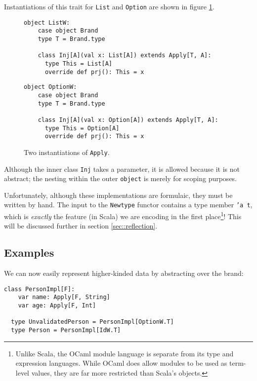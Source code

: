 \documentclass[acmsmall,screen]{acmart}
\begin{document}
Instantiations of this trait for \texttt{List} and \texttt{Option} are shown in
figure \ref{fig::instantiation}.

\begin{figure}[ht]
  \begin{minipage}{0.48\textwidth}
    \begin{lstlisting}[style=scala]
  object ListW:
    case object Brand
    type T = Brand.type

    class Inj[A](val x: List[A]) extends Apply[T, A]:
      type This = List[A]
      override def prj(): This = x
    \end{lstlisting}
  \end{minipage}
  \hfill
  \begin{minipage}{0.48\textwidth}
    \begin{lstlisting}[style=scala]
  object OptionW:
    case object Brand
    type T = Brand.type

    class Inj[A](val x: Option[A]) extends Apply[T, A]:
      type This = Option[A]
      override def prj(): This = x
    \end{lstlisting}
  \end{minipage}
  \caption{Two instantiations of \texttt{Apply}.}\label{fig::instantiation}
\end{figure}

Although the inner class \texttt{Inj} takes a parameter, it is allowed because
it is not abstract; the nesting within the outer \texttt{object} is merely for
scoping purposes.

Unfortunately, although these implementations are formulaic, they must be
written by hand. The input to the \texttt{Newtype} functor contains a type
member \texttt{'a t}, which is \emph{exactly} the feature (in Scala) we are
encoding in the first place\footnote{Unlike Scala, the OCaml module language is
separate from its type and expression languages. While OCaml does allow modules
to be used as term-level values, they are far more restricted than Scala's
objects.}! This will be discussed further in section \ref{sec::reflection}.

\subsection{Examples}

We can now easily represent higher-kinded data by abstracting over the brand:
\begin{lstlisting}[style=scala]
  class PersonImpl[F]:
    var name: Apply[F, String]
    var age: Apply[F, Int]

  type UnvalidatedPerson = PersonImpl[OptionW.T]
  type Person = PersonImpl[IdW.T]
\end{lstlisting}
\end{document}
